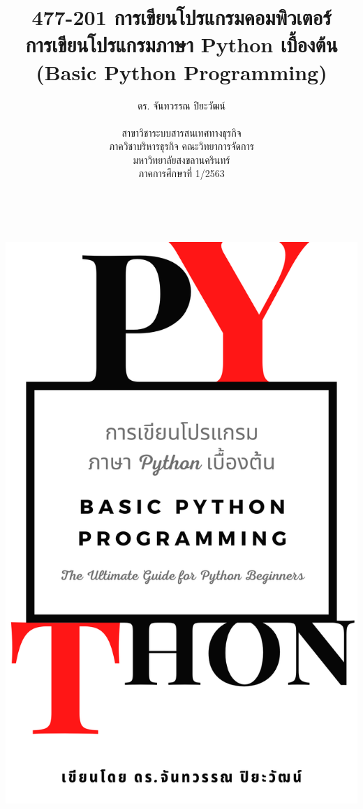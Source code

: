 \documentclass[14pt,a4paper,oneside]{extbook}
\begin{document}

\frontmatter
\begin{titlepage}
\centering
\includegraphics[width=\textwidth,height=23cm,keepaspectratio]{bookcover.png}
\end{titlepage}

\title{
477-201 การเขียนโปรแกรมคอมพิวเตอร์\\
\vspace{1mm}
การเขียนโปรแกรมภาษา Python เบื้องต้น\\
(Basic Python Programming)
}
\author{
ดร. จันทวรรณ ปิยะวัฒน์\\
\vspace{1mm}\\
สาขาวิชาระบบสารสนเทศทางธุรกิจ\\
ภาควิชาบริหารธุรกิจ คณะวิทยาการจัดการ\\
มหาวิทยาลัยสงขลานครินทร์\\
ภาคการศึกษาที่ 1/2563
}
\date{\vspace{1ex}}
\maketitle

\tableofcontents
\listoffigures
\listoftables
\end{document}
